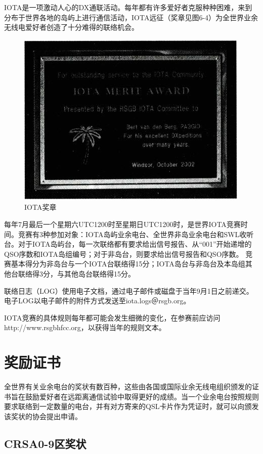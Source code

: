 \documentclass[12pt,UTF8]{ctexbook}
\begin{document}
IOTA是一项激动人心的DX通联活动。每年都有许多爱好者克服种种困难，来到分布于世界各地的岛屿上进行通信活动，IOTA远征（奖章见图6-4）为全世界业余无线电爱好者创造了十分难得的联络机会。

\begin{figure}[htbp]
	\centering
	\includegraphics[width=0.7\linewidth]{74}
	\caption{IOTA奖章}
	\label{fig:1}
\end{figure}

每年7月最后一个星期六UTC1200时至星期日UTC1200时，是世界IOTA竞赛时间。竞赛有3种参加对象：IOTA岛屿业余电台、全世界非岛业余电台和SWL收听台。对于IOTA岛屿台，每一次联络都有要求给出信号报告、从“001”开始递增的QSO序数和IOTA岛组编号；对于非岛台，则要求给出信号报告和QSO序数。
竞赛基本得分为非岛台与一个IOTA台联络得15分；IOTA岛台与非岛台及本岛组其他台联络得3分，与其他岛台联络得15分。

联络日志（LOG）使用电子文档，通过电子邮件或磁盘于当年9月1日之前递交。电子LOG以电子邮件的附件方式发送至iota.logs＠rsgb.org。

IOTA竞赛的具体规则每年都可能会发生细微的变化，在参赛前应访问http://www.rsgbhfcc.org，以获得当年的规则文本。

\section{奖励证书}

全世界有关业余电台的奖状有数百种，这些由各国或国际业余无线电组织颁发的证书旨在鼓励爱好者在远距离通信试验中取得更好的成绩。当一个业余电台按照规则要求联络到一定数量的电台，并有对方寄来的QSL卡片作为凭证时，就可以向颁发该奖状的协会提出申请。

\subsection{CRSA0-9区奖状}
\end{document}
